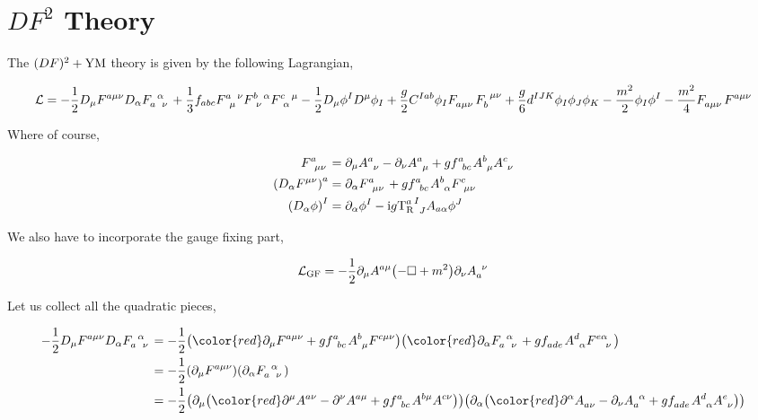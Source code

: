 \section{$DF^2$ Theory}

The $(DF)^2+\textnormal{YM}$ theory is given by the following Lagrangian,

\[\mathcal L = -\frac12 D_\mu F^{a\mu \nu}D_\alpha \tensor{F}{_a^\alpha_\nu}+\frac13 f_{abc}\tensor{F}{^a_\mu^\nu}\tensor{F}{^b_\nu^\alpha}\tensor{F}{^c_\alpha^\mu}-\frac12D_\mu\phi^ID^\mu\phi_I+\frac g2\tensor{C}{^I^a^b}\phi_I\tensor{F}{_a_\mu_\nu}\tensor{F}{_b^\mu^\nu}+\frac g6 d^{IJK}\phi_I\phi_J\phi_K-\frac{m^2}{2}\phi_I\phi^I-\frac{m^2}{4}\tensor{F}{_a_\mu_\nu}\tensor{F}{^a^\mu^\nu}\]

Where of course,

\begin{align*}
    \tensor{F}{^a_\mu_\nu}&=\partial_\mu \tensor{A}{^a_\nu}-\partial_\nu \tensor{A}{^a_\mu}+g \tensor{f}{^a_b_c}\tensor{A}{^b_\mu}\tensor{A}{^c_\nu}\\
    \qty(D_\alpha F^{\mu\nu})^a&=\partial_\alpha \tensor{F}{^a_\mu_\nu}+g \tensor{f}{^a_b_c}\tensor{A}{^b_\alpha}\tensor{F}{^c_\mu_\nu}\\
    \qty(D_\alpha\phi)^I&=\partial_\alpha\phi^I-\im g \tensor{{\textnormal{T}^a_{\textnormal{R}}}}{^I_J}A_{a\alpha}\phi^J
\end{align*}

We also have to incorporate the gauge fixing part,

\[\mathcal L_{\textnormal{GF}}=-\frac12\partial_\mu A^{a\mu}\qty(-\Box+m^2)\partial_\nu \tensor{A}{_a^\nu}\]

Let us collect all the quadratic pieces,

\begin{align*}
    -\frac12 D_\mu F^{a\mu \nu}D_\alpha \tensor{F}{_a^\alpha_\nu}&=-\frac12\qty({\color{red}\partial_\mu \tensor{F}{^a^\mu^\nu}}+g \tensor{f}{^a_b_c}\tensor{A}{^b_\mu}\tensor{F}{^c^\mu^\nu})\qty({\color{red}\partial_\alpha \tensor{F}{_a^\alpha_\nu}}+g \tensor{f}{_a_d_e}\tensor{A}{^d_\alpha}\tensor{F}{^e^\alpha_\nu})\\
    &=-\frac12\qty(\partial_\mu \tensor{F}{^a^\mu^\nu})\qty(\partial_\alpha \tensor{F}{_a^\alpha_\nu})\\
    &=-\frac12\qty(\partial_\mu\qty({\color{red}\partial^\mu \tensor{A}{^a^\nu}-\partial^\nu \tensor{A}{^a^\mu}}+g \tensor{f}{^a_b_c}\tensor{A}{^b^\mu}\tensor{A}{^c^\nu}))\qty(\partial_\alpha\qty({\color{red}\partial^\alpha \tensor{A}{_a_\nu}-\partial_\nu \tensor{A}{_a^\alpha}}+g \tensor{f}{_a_d_e}\tensor{A}{^d_\alpha}\tensor{A}{^e_\nu}))
\end{align*}